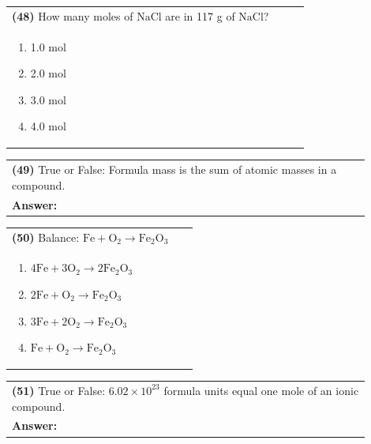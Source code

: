 \documentclass{article}
\begin{document}
\vspace{0.2cm}
\noindent \begin{tabular}{|p{0.9\linewidth}|}
\hline
\vspace{0.2cm}
\textbf{(48)} How many moles of $\mathrm{NaCl}$ are in 117 g of $\mathrm{NaCl}$?\\
\begin{minipage}[t]{0.85\linewidth}
\begin{enumerate}[label=\alph*.]
\item 1.0 mol
\item 2.0 mol
\item 3.0 mol
\item 4.0 mol
\end{enumerate}
\end{minipage}\\
\hline
\end{tabular}
\newpage

\vspace{0.2cm}
\noindent \begin{tabular}{|p{0.9\linewidth}|}
\hline
\vspace{0.2cm}
\textbf{(49)} True or False: Formula mass is the sum of atomic masses in a compound.\\
\textbf{Answer:} \underline{\hspace{2cm}}\\
\hline
\end{tabular}

\vspace{0.2cm}
\noindent \begin{tabular}{|p{0.9\linewidth}|}
\hline
\vspace{0.2cm}
\textbf{(50)} Balance: $\mathrm{Fe + O_2 \rightarrow Fe_2O_3}$\\
\begin{minipage}[t]{0.85\linewidth}
\begin{enumerate}[label=\alph*.]
\item $\mathrm{4Fe + 3O_2 \rightarrow 2Fe_2O_3}$
\item $\mathrm{2Fe + O_2 \rightarrow Fe_2O_3}$
\item $\mathrm{3Fe + 2O_2 \rightarrow Fe_2O_3}$
\item $\mathrm{Fe + O_2 \rightarrow Fe_2O_3}$
\end{enumerate}
\end{minipage}\\
\hline
\end{tabular}

\vspace{0.2cm}
\noindent \begin{tabular}{|p{0.9\linewidth}|}
\hline
\vspace{0.2cm}
\textbf{(51)} True or False: $6.02\times10^{23}$ formula units equal one mole of an ionic compound.\\
\textbf{Answer:} \underline{\hspace{2cm}}\\
\hline
\end{tabular}
\end{document}

